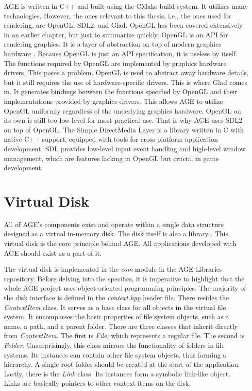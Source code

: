 \documentclass[
  digital,     %
  oneside,     %
  nosansbold,  %
  nocolorbold, %
  lof,         %
  lot,         %
]{fithesis4}
\begin{document}
AGE is written in C++ and built using the CMake build system. It utilizes many technologies. However,
the ones relevant to this thesis, i.e., the ones used for rendering, are OpenGL, SDL2, and Glad.
OpenGL has been covered extensively in an earlier chapter, but just to summarize quickly. OpenGL is an
API for rendering graphics. It is a layer of abstraction on top of modern graphics hardware \cite{khronos}.
Because OpenGL is just an API specification, it is useless by itself.
The functions required by OpenGL are implemented by graphics hardware drivers. This poses a problem.
OpenGL is used to abstract away hardware details, but it still requires the use of hardware-specific drivers.
This is where Glad \cite{glad} comes in. It generates bindings between the functions specified by OpenGL
and their implementations provided by graphics drivers. This allows AGE to utilize OpenGL uniformly
regardless of the underlying graphics hardware. OpenGL on its own is still too low-level
for most practical use. That is why AGE uses SDL2 on top of OpenGL. The Simple DirectMedia Layer \cite{sdl}
is a library written in C with native C++ support, equipped with tools for cross-platform application
development. SDL provides low-level input event handling and high-level window management, which are features lacking in OpenGL
but crucial in game development.

\section{Virtual Disk}
All of AGE's components exist and operate within a single data structure designed as a virtual in-memory disk.
The disk itself is also a library \cite{age-app-template-readme}.
This virtual disk is the core principle behind AGE. All applications developed with AGE should
exist as a part of it.

The virtual disk is implemented in the \textit{com} module in the AGE Libraries repository.
Before delving into the specifics, it is imperative to highlight that the whole AGE project
uses object-oriented programming principles. The majority
of the disk interface is defined in the \textit{context.hpp} header file. There resides the \textit{ContextItem}
class. It serves as a base class for all objects in the virtual file system. It encompasses the basic
properties of file system objects, such as a name, a path, and a parent folder. There are three classes
that inherit directly from \textit{ContextItem}. The first is \textit{File}, which represents a regular
file. The second is \textit{Folder}. Unsurprisingly, this class mirrors the functionality of folders
in file systems. Its instances can contain other file system objects, thus forming a hierarchy.
A single root folder should be created at the start of the application. Lastly, there is the \textit{Link}
class. Its instances form a symbolic link-like object. Links are basically pointers to other context items
on the disk.
\end{document}
